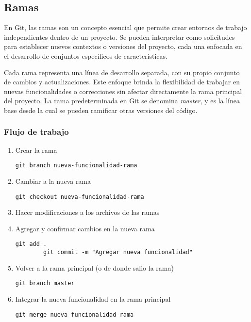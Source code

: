 \subsection{Ramas}

En Git, las ramas son un concepto esencial que permite crear entornos de trabajo independientes 
dentro de un proyecto. Se pueden interpretar como solicitudes para establecer nuevos contextos 
o versiones del proyecto, cada una enfocada en el desarrollo de conjuntos específicos de características.

Cada rama representa una línea de desarrollo separada, con su propio conjunto de 
cambios y actualizaciones. Este enfoque brinda la flexibilidad de trabajar en nuevas 
funcionalidades o correcciones sin afectar directamente la rama principal del proyecto. 
La rama predeterminada en Git se denomina \textit{master}, y es la línea base desde la cual 
se pueden ramificar otras versiones del código.

\subsubsection*{Flujo de trabajo}
\begin{enumerate}
    \item Crear la rama 
    \begin{lstlisting}[style=bashstyle]
        git branch nueva-funcionalidad-rama
    \end{lstlisting}

    \item Cambiar a la nueva rama 
    \begin{lstlisting}[style=bashstyle]
        git checkout nueva-funcionalidad-rama
    \end{lstlisting}

    \item Hacer modificaciones a los archivos de las ramas

    \item Agregar y confirmar cambios en la nueva rama
    \begin{lstlisting}[style=bashstyle]
        git add .
        git commit -m "Agregar nueva funcionalidad"
    \end{lstlisting}

    \item Volver a la rama principal (o de donde salio la rama)
    \begin{lstlisting}[style=bashstyle]
        git branch master
    \end{lstlisting}

    \item Integrar la nueva funcionalidad en la rama principal
    \begin{lstlisting}[style=bashstyle]
        git merge nueva-funcionalidad-rama
    \end{lstlisting}
\end{enumerate}

